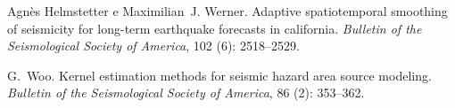 \documentclass[final]{beamer}
\begin{document}
\begin{poster}
Agn{\`e}s Helmstetter e Maximilian~J. Werner.
Adaptive spatiotemporal smoothing of seismicity for long-term
  earthquake forecasts in california.
\emph{Bulletin of the Seismological Society of America}, 102
  (6): 2518--2529.

G.~Woo.
Kernel estimation methods for seismic hazard area source modeling.
\emph{Bulletin of the Seismological Society of America}, 86
  (2): 353--362.

\end{poster}
\end{document}
